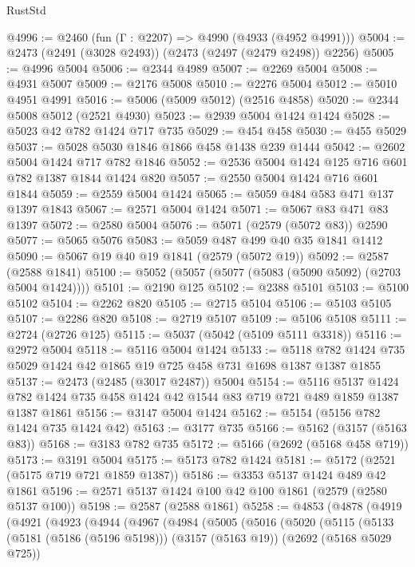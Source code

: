 \begin{lexlean}{RustStd}
\begin{coremodule}
@4996 := @2460 (fun (Γ : @2207) => @4990 (@4933 (@4952 @4991)))
@5004 := @2473 (@2491 (@3028 @2493)) (@2473 (@2497 (@2479 @2498)) @2256)
@5005 := @4996 @5004
@5006 := @2344 @4989
@5007 := @2269 @5004
@5008 := @4931 @5007
@5009 := @2176 @5008
@5010 := @2276 @5004
@5012 := @5010 @4951 @4991
@5016 := @5006 (@5009 @5012) (@2516 @4858)
@5020 := @2344 @5008 @5012 (@2521 @4930)
@5023 := @2939 @5004 @1424 @1424
@5028 := @5023 @42 @782 @1424 @717 @735
@5029 := @454 @458
@5030 := @455 @5029
@5037 := @5028 @5030 @1846 @1866 @458 @1438 @239 @1444
@5042 := @2602 @5004 @1424 @717 @782 @1846
@5052 := @2536 @5004 @1424 @125 @716 @601 @782 @1387 @1844 @1424 @820
@5057 := @2550 @5004 @1424 @716 @601 @1844
@5059 := @2559 @5004 @1424
@5065 := @5059 @484 @583 @471 @137 @1397 @1843
@5067 := @2571 @5004 @1424
@5071 := @5067 @83 @471 @83 @1397
@5072 := @2580 @5004
@5076 := @5071 (@2579 (@5072 @83)) @2590
@5077 := @5065 @5076
@5083 := @5059 @487 @499 @40 @35 @1841 @1412
@5090 := @5067 @19 @40 @19 @1841 (@2579 (@5072 @19))
@5092 := @2587 (@2588 @1841)
@5100 := @5052 (@5057 (@5077 (@5083 (@5090 @5092) (@2703 @5004 @1424))))
@5101 := @2190 @125
@5102 := @2388 @5101
@5103 := @5100 @5102
@5104 := @2262 @820
@5105 := @2715 @5104
@5106 := @5103 @5105
@5107 := @2286 @820
@5108 := @2719 @5107
@5109 := @5106 @5108
@5111 := @2724 (@2726 @125)
@5115 := @5037 (@5042 (@5109 @5111 @3318))
@5116 := @2972 @5004
@5118 := @5116 @5004 @1424
@5133 := @5118 @782 @1424 @735 @5029 @1424 @42 @1865 @19 @725 @458 @731 @1698 @1387 @1387 @1855
@5137 := @2473 (@2485 (@3017 @2487)) @5004
@5154 := @5116
    @5137
    @1424
    @782
    @1424
    @735
    @458
    @1424
    @42
    @1544
    @83
    @719
    @721
    @489
    @1859
    @1387
    @1387
    @1861
@5156 := @3147 @5004 @1424
@5162 := @5154 (@5156 @782 @1424 @735 @1424 @42)
@5163 := @3177 @735
@5166 := @5162 (@3157 (@5163 @83))
@5168 := @3183 @782 @735
@5172 := @5166 (@2692 (@5168 @458 @719))
@5173 := @3191 @5004
@5175 := @5173 @782 @1424
@5181 := @5172 (@2521 (@5175 @719 @721 @1859 @1387))
@5186 := @3353 @5137 @1424 @489 @42 @1861
@5196 := @2571 @5137 @1424 @100 @42 @100 @1861 (@2579 (@2580 @5137 @100))
@5198 := @2587 (@2588 @1861)
@5258 := @4853
    (@4878
      (@4919
        (@4921
          (@4923
            (@4944
              (@4967
                (@4984
                  (@5005
                    (@5016
                      (@5020
                        (@5115
                          (@5133
                            (@5181 (@5186 (@5196 @5198)))
                            (@3157 (@5163 @19))
                            (@2692 (@5168 @5029 @725))

\end{coremodule}
\end{lexlean}
